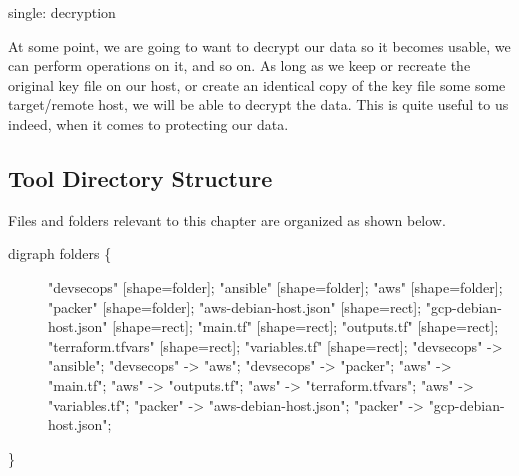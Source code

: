 single: decryption

At some point, we are going to want to decrypt our data so it becomes
usable, we can perform operations on it, and so on. As long as we keep
or recreate the original key file on our host, or create an identical
copy of the key file some some target/remote host, we will be able to
decrypt the data. This is quite useful to us indeed, when it comes to
protecting our data.

\begin{Shaded}
\begin{Highlighting}[]
\end{Highlighting}
\end{Shaded}

\clearpage

\hypertarget{tool-directory-structure}{%
\subsection{Tool Directory Structure}\label{tool-directory-structure}}

Files and folders relevant to this chapter are organized as shown below.

\begin{description}
\item[digraph folders \{]
"devsecops" {[}shape=folder{]}; "ansible" {[}shape=folder{]}; "aws"
{[}shape=folder{]}; "packer" {[}shape=folder{]}; "aws-debian-host.json"
{[}shape=rect{]}; "gcp-debian-host.json" {[}shape=rect{]}; "main.tf"
{[}shape=rect{]}; "outputs.tf" {[}shape=rect{]}; "terraform.tfvars"
{[}shape=rect{]}; "variables.tf" {[}shape=rect{]}; "devsecops"
-\textgreater{} "ansible"; "devsecops" -\textgreater{} "aws";
"devsecops" -\textgreater{} "packer"; "aws" -\textgreater{} "main.tf";
"aws" -\textgreater{} "outputs.tf"; "aws" -\textgreater{}
"terraform.tfvars"; "aws" -\textgreater{} "variables.tf"; "packer"
-\textgreater{} "aws-debian-host.json"; "packer" -\textgreater{}
"gcp-debian-host.json";
\end{description}

\}
